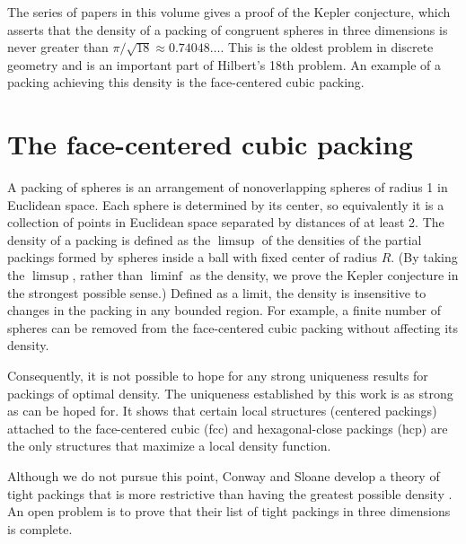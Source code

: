 









The series of papers in this volume gives a proof of the Kepler
conjecture, which asserts that the density of a packing of
congruent spheres in three dimensions is never greater than
$\pi/\sqrt{18}\approx 0.74048\ldots$. This is the oldest problem
in discrete geometry and is an important part of Hilbert's 18th
problem. An example of a packing achieving this density is the
face-centered cubic packing.


\label{sec:intro-review}

\section{The face-centered cubic packing}

A packing of spheres is an arrangement of
nonoverlapping spheres of radius 1 in Euclidean space.
Each sphere is determined by its center, so equivalently it is a collection
of points in Euclidean space separated by distances of at least 2.
The density of a packing is defined as the $\limsup$ of
the densities of the partial packings formed by spheres inside
a ball with fixed center of radius $R$.
(By taking the $\limsup$,
rather than $\liminf$ as the density, we prove the Kepler
conjecture in the strongest possible sense.)
Defined as a limit, the density
is insensitive to changes in the packing in any bounded region.
For example, a finite number of spheres can be removed from the
face-centered cubic packing without affecting its density.

Consequently, it is not possible to hope for any strong uniqueness
results for packings of optimal density.  The uniqueness
established by this work is as strong as can be hoped for. It
shows that certain local structures (centered packings) attached
to the face-centered cubic (fcc) and hexagonal-close packings
(hcp) are the only structures that maximize a local density
function.

Although we do not pursue this point, Conway and Sloane develop
a theory of tight packings that is more restrictive than having the
greatest possible density \cite{CoSl95}.
An open problem is to prove that their
list of tight packings in three dimensions is complete.

